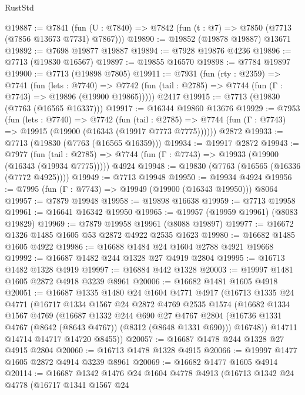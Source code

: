 \begin{lexlean}{RustStd}
\begin{coremodule}
@19887 := @7841
    (fun (U : @7840) => @7842 (fun (t : @7) => @7850 (@7713 (@7856 @13673 @7731) @7867)))
@19890 := @19852 (@19878 @19887) @13671
@19892 := @7698 @19877 @19887
@19894 := @7928 @19876 @4236
@19896 := @7713 (@19830 @16567)
@19897 := @19855 @16570
@19898 := @7784 @19897
@19900 := @7713 (@19898 @7805)
@19911 := @7931
    (fun (rty : @2359) =>
    @7741
      (fun (lets : @7740) =>
      @7742 (fun (tail : @2785) => @7744 (fun (Γ : @7743) => @19896 (@19900 @19865)))))
    @2417
@19915 := @7713 (@19830 (@7763 (@16565 @16337)))
@19917 := @16344 @19860 @13676
@19929 := @7953
    (fun (lets : @7740) =>
    @7742
      (fun (tail : @2785) =>
      @7744 (fun (Γ : @7743) => @19915 (@19900 (@16343 (@19917 @7773 @7775))))))
    @2872
@19933 := @7713 (@19830 (@7763 (@16565 @16359)))
@19934 := @19917 @2872
@19943 := @7977
    (fun (tail : @2785) => @7744 (fun (Γ : @7743) => @19933 (@19900 (@16343 (@19934 @7775)))))
    @4924
@19948 := @19830 (@7763 (@16565 (@16336 (@7772 @4925))))
@19949 := @7713 @19948
@19950 := @19934 @4924
@19956 := @7995 (fun (Γ : @7743) => @19949 (@19900 (@16343 @19950))) @8064
@19957 := @7879 @19948
@19958 := @19898 @16638
@19959 := @7713 @19958
@19961 := @16641 @16342 @19950
@19965 := @19957 (@19959 @19961) (@8083 @19829)
@19969 := @7879 @19958 @19961 (@8088 @19897)
@19977 := @16672 @1326 @1485 @1605 @53 @2872 @4922 @2535 @1623
@19980 := @16682 @1485 @1605 @4922
@19986 := @16688 @1484 @24 @1604 @2788 @4921 @19668
@19992 := @16687 @1482 @244 @1328 @27 @4919 @2804
@19995 := @16713 @1482 @1328 @4919
@19997 := @16884 @442 @1328
@20003 := @19997 @1481 @1605 @2872 @4918 @3239 @8961
@20006 := @16682 @1481 @1605 @4918
@20051 := @16687
    @1335
    @1480
    @24
    @1604
    @4771
    @4917
    (@16713
      @1335
      @24
      @4771
      (@16717
        @1334
        @1567
        @24
        @2872
        @4769
        @2535
        @1574
        (@16682
          @1334
          @1567
          @4769
          (@16687
            @1332
            @244
            @690
            @27
            @4767
            @2804
            (@16736 @1331 @4767 (@8642 (@8643 @4767)) (@8312 (@8648 @1331 @690)))
            @16748))
        @14711
        @14714
        @14717
        @14720
        @8455))
@20057 := @16687 @1478 @244 @1328 @27 @4915 @2804
@20060 := @16713 @1478 @1328 @4915
@20066 := @19997 @1477 @1605 @2872 @4914 @3239 @8961
@20069 := @16682 @1477 @1605 @4914
@20114 := @16687
    @1342
    @1476
    @24
    @1604
    @4778
    @4913
    (@16713
      @1342
      @24
      @4778
      (@16717
        @1341
        @1567
        @24

\end{coremodule}
\end{lexlean}
